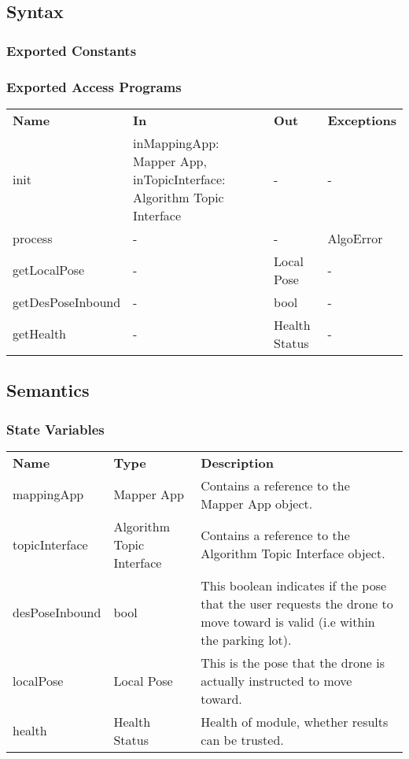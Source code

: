 \documentclass[12pt, titlepage]{article}
\begin{document}
\subsection{Syntax}
\subsubsection{Exported Constants}
\subsubsection{Exported Access Programs}
\begin{center}
\begin{tabular}{p{3.5cm} p{2.5cm} p{2.5cm} p{5cm}}
\hline
\textbf{Name} & \textbf{In} & \textbf{Out} & \textbf{Exceptions} \\
init & inMappingApp: Mapper App, inTopicInterface: Algorithm Topic Interface & - & - \\
process & - & - & AlgoError \\
getLocalPose & - & Local Pose & - \\
getDesPoseInbound & - & bool & - \\
getHealth & - & Health Status & - \\
\hline
\hline
\end{tabular}
\end{center}
\subsection{Semantics}
\subsubsection{State Variables}
\begin{center}
\begin{tabular}{p{3 cm} p{3cm} p{7cm} }
\hline
\textbf{Name} & \textbf{Type} & \textbf{Description}  \\
mappingApp & Mapper App & Contains a reference to the Mapper App object. \\
topicInterface & Algorithm Topic Interface & Contains a reference to the Algorithm Topic Interface object.\\
desPoseInbound & bool & This boolean indicates if the pose that the user requests the drone to move toward is valid (i.e within the parking lot).  \\ 
localPose & Local Pose & This is the pose that the drone is actually instructed to move toward. \\
health & Health Status & Health of module, whether results can be trusted.   \\
\hline
\hline
\end{tabular}
\end{center}
\end{document}
